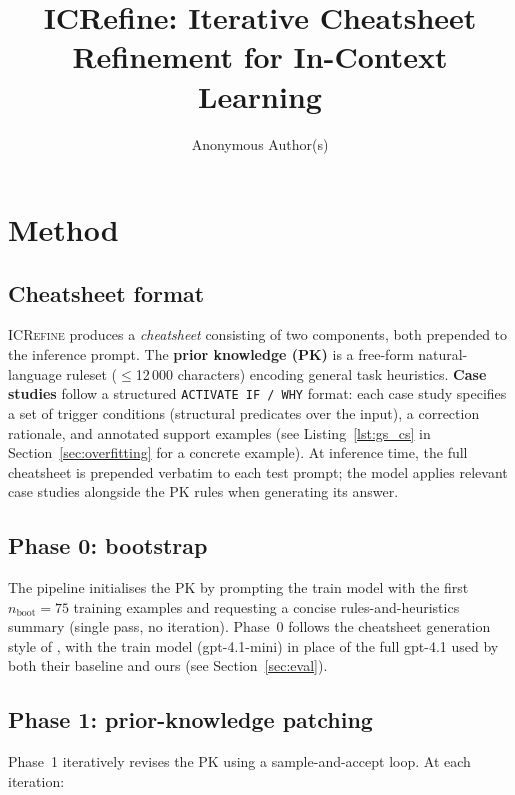 \documentclass{article}
\title{ICRefine: Iterative Cheatsheet Refinement for In-Context Learning}
\author{%
  Anonymous Author(s)
}
\begin{document}
\maketitle

\section{Method}
\label{sec:method}

\subsection{Cheatsheet format}
\label{sec:format}

\textsc{ICRefine} produces a \emph{cheatsheet} consisting of two components, both prepended
to the inference prompt.
The \textbf{prior knowledge (PK)} is a free-form natural-language ruleset
($\leq$12\,000 characters) encoding general task heuristics.
\textbf{Case studies} follow a structured \texttt{ACTIVATE~IF / WHY} format:
each case study specifies a set of trigger conditions (structural predicates over the input),
a correction rationale, and annotated support examples
(see Listing~\ref{lst:gs_cs} in Section~\ref{sec:overfitting} for a concrete example).
At inference time, the full cheatsheet is prepended verbatim to each test prompt; the model
applies relevant case studies alongside the PK rules when generating its answer.

\subsection{Phase 0: bootstrap}
\label{sec:phase0}

The pipeline initialises the PK by prompting the train model with the first
$n_\text{boot}=75$ training examples and requesting a concise rules-and-heuristics summary
(single pass, no iteration).
Phase~0 follows the cheatsheet generation style of \citet{csicl2024}, with the
train model (gpt-4.1-mini) in place of the full gpt-4.1 used by both their baseline
and ours (see Section~\ref{sec:eval}).

\subsection{Phase 1: prior-knowledge patching}
\label{sec:phase1}

Phase~1 iteratively revises the PK using a sample-and-accept loop.
At each iteration:
\end{document}
